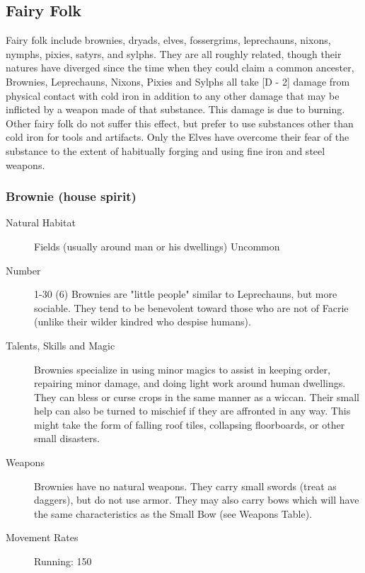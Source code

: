 \begin{multicols}{2}
\subsection{Fairy Folk}
Fairy folk include brownies, dryads, elves, fossergrims, leprechauns,
nixons, nymphs, pixies, satyrs, and sylphs.  They are all roughly
related, though their natures have diverged since the time when they
could claim a common ancester, Brownies, Leprechauns, Nixons, Pixies
and Sylphs all take [D - 2] damage from physical contact with cold
iron in addition to any other damage that may be inflicted by a weapon
made of that substance.  This damage is due to burning. Other fairy
folk do not suffer this effect, but prefer to use substances other
than cold iron for tools and artifacts. Only the Elves have overcome
their fear of the substance to the extent of habitually forging and
using fine iron and steel weapons.

\subsubsection{Brownie (house spirit)}

\begin{description}
\item[Natural Habitat] Fields (usually around man or his dwellings) Uncommon

\item[Number] 1-30 (6)
 Brownies are "little people" similar to Leprechauns, but
more sociable. They tend to be benevolent toward those who are not of
Facrie (unlike their wilder kindred who despise humans).

\item[Talents, Skills and Magic] Brownies specialize in using minor magics to assist in
keeping order, repairing minor damage, and doing light work around
human dwellings. They can bless or curse crops in the same manner as a
wiccan. Their small help can also be turned to mischief if they are
affronted in any way. This might take the form of falling roof tiles,
collapsing floorboards, or other small disasters.

\item[Weapons] Brownies have no natural weapons. They carry small swords
(treat as daggers), but do not use armor. They may also carry bows
which will have the same characteristics as the Small Bow (see Weapons
Table).


\item[Movement Rates] Running: 150


\end{description}
\end{multicols}
